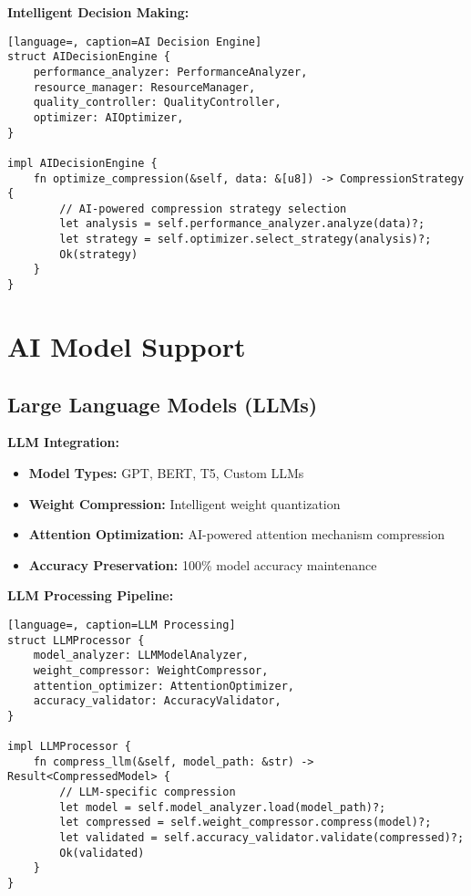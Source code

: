 \documentclass[12pt,a4paper]{article}
\begin{document}
\textbf{Intelligent Decision Making:}
\begin{lstlisting}[language=, caption=AI Decision Engine]
struct AIDecisionEngine {
    performance_analyzer: PerformanceAnalyzer,
    resource_manager: ResourceManager,
    quality_controller: QualityController,
    optimizer: AIOptimizer,
}

impl AIDecisionEngine {
    fn optimize_compression(&self, data: &[u8]) -> CompressionStrategy {
        // AI-powered compression strategy selection
        let analysis = self.performance_analyzer.analyze(data)?;
        let strategy = self.optimizer.select_strategy(analysis)?;
        Ok(strategy)
    }
}
\end{lstlisting}

\section{AI Model Support}

\subsection{Large Language Models (LLMs)}

\textbf{LLM Integration:}
\begin{itemize}
    \item \textbf{Model Types:} GPT, BERT, T5, Custom LLMs
    \item \textbf{Weight Compression:} Intelligent weight quantization
    \item \textbf{Attention Optimization:} AI-powered attention mechanism compression
    \item \textbf{Accuracy Preservation:} 100\% model accuracy maintenance
\end{itemize}

\textbf{LLM Processing Pipeline:}
\begin{lstlisting}[language=, caption=LLM Processing]
struct LLMProcessor {
    model_analyzer: LLMModelAnalyzer,
    weight_compressor: WeightCompressor,
    attention_optimizer: AttentionOptimizer,
    accuracy_validator: AccuracyValidator,
}

impl LLMProcessor {
    fn compress_llm(&self, model_path: &str) -> Result<CompressedModel> {
        // LLM-specific compression
        let model = self.model_analyzer.load(model_path)?;
        let compressed = self.weight_compressor.compress(model)?;
        let validated = self.accuracy_validator.validate(compressed)?;
        Ok(validated)
    }
}
\end{lstlisting}
\end{document}
